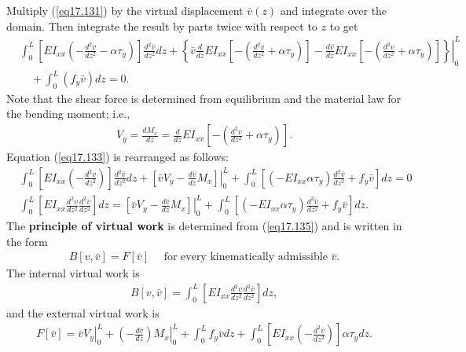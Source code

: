\documentclass{AeroStructure-ERJohnson}
\begin{document}
Multiply (\ref{eq17.131}) by the virtual displacement $\bar{v}(z)$ and integrate over the domain. Then integrate the result by parts twice with respect to $z$ to get
\begin{align}\label{eq17.133}
&\int_{0}^{L}\left[E I_{x x}\left(-\frac{d^{2} v}{d z^{2}}-\alpha \tau_{y}\right)\right] \frac{d^{2} \bar{v}}{d z^{2}} d z+\left.\left\{\bar{v} \frac{d}{d z} E I_{x x}\left[-\left(\frac{d^{2} v}{d z^{2}}+\alpha \tau_{y}\right)\right]-\frac{d \bar{v}}{d z} E I_{x x}\left[-\left(\frac{d^{2} v}{d z^{2}}+\alpha \tau_{y}\right)\right]\right\}\right|_{0} ^{L}\nonumber\\
&\quad +\int_{0}^{L}\left(f_{y} \bar{v}\right) d z=0.
\end{align}
Note that the shear force is determined from equilibrium and the material law for the bending moment; i.e.,
\begin{align}\label{eq17.134}
V_{y}=\frac{d M_{x}}{d z}=\frac{d}{d z} E I_{x x}\left[-\left(\frac{d^{2} v}{d z^{2}}+\alpha \tau_{y}\right)\right].
\end{align}
Equation (\ref{eq17.133}) is rearranged as follows:
\begin{align}
&\int_{0}^{L}\left[E I_{x x}\left(-\frac{d^{2} v}{d z^{2}}\right)\right] \frac{d^{2} \bar{v}}{d z^{2}} d z+\left.\left[\bar{v} V_{y}-\frac{d \bar{v}}{d z} M_{x}\right]\right|_{0} ^{L}+\int_{0}^{L}\left[\left(-E I_{x x} \alpha \tau_{y}\right) \frac{d^{2} \bar{v}}{d z^{2}}+f_{y} \bar{v}\right] d z=0 \nonumber\\
&\int_{0}^{L}\left[E I_{x x} \frac{d^{2} v}{d z^{2}} \frac{d^{2} \bar{v}}{d z^{2}}\right] d z=\left.\left[\bar{v} V_{y}-\frac{d \bar{v}}{d z} M_{x}\right]\right|_{0} ^{L}+\int_{0}^{L}\left[\left(-E I_{x x} \alpha \tau_{y}\right) \frac{d^{2} \bar{v}}{d z^{2}}+f_{y} \bar{v}\right] d z. \label{eq17.135}
\end{align}
The \textbf{principle of virtual work} is determined from (\ref{eq17.135}) and is written in the form
\begin{align}\label{eq17.136}
B[v, \bar{v}]=F[\bar{v}] \quad \textrm{ for every kinematically admissible } \bar{v}.
\end{align}
The internal virtual work is
\begin{align}\label{eq17.137}
B[v, \bar{v}]=\int_{0}^{L}\left[E I_{x x} \frac{d^{2} v}{d z^{2}} \frac{d^{2} \bar{v}}{d z^{2}}\right] d z,
\end{align}
and the external virtual work is
\begin{align}\label{eq17.138}
F[\bar{v}]=\left.\bar{v} V_{y}\right|_{0} ^{L}+\left.\left(-\frac{d \bar{v}}{d z}\right) M_{x}\right|_{0} ^{L}+\int_{0}^{L} f_{y} \bar{v} d z+\int_{0}^{L}\left[E I_{x x}\left(-\frac{d^{2} \bar{v}}{d z^{2}}\right)\right] \alpha \tau_{y} d z.
\end{align}
\end{document}
